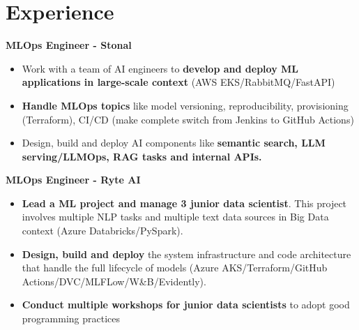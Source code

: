 \documentclass[a4paper,10pt]{article}
\begin{document}
\begin{adjustbox}{valign=t}
    \begin{minipage}{0.6\textwidth}
        \vspace{.5cm}
        \section*{Experience}
        \vspace{-.3cm}
        \begin{description}
            \raggedright
            \item[\normalfont \textcolor{ColorOne}{Since Jan. 2024}]
                \textbf{MLOps Engineer - Stonal}\\
                \small
                \begin{itemize}[topsep=0pt]
                    \item Work with a team of AI engineers to \textbf{develop and deploy ML applications in large-scale context} (AWS EKS/RabbitMQ/FastAPI)
                    \item \textbf{Handle MLOps topics} like model versioning, reproducibility, provisioning (Terraform), CI/CD (make complete switch from Jenkins to GitHub Actions)
                    \item Design, build and deploy AI components like \textbf{semantic search, LLM serving/LLMOps, RAG tasks and internal APIs.}
                \end{itemize}
                \normalsize
            \item[\normalfont \textcolor{ColorOne}{Oct. 2023 -- Jan. 2024}]
                \textbf{MLOps Engineer - Ryte AI}\\
                \small
                \begin{itemize}[topsep=0pt]
                    \item \textbf{Lead a ML project and manage 3 junior data scientist}. This project involves multiple NLP tasks and multiple text data sources in Big Data context (Azure Databricks/PySpark).
                    \item \textbf{Design, build and deploy} the system infrastructure and code architecture that handle the full lifecycle of models (Azure AKS/Terraform/GitHub Actions/DVC/MLFLow/W\&B/Evidently).
                    \item \textbf{Conduct multiple workshops for junior data scientists} to adopt good programming practices
                \end{itemize}

\end{description}
\end{minipage}
\end{adjustbox}
\end{document}

